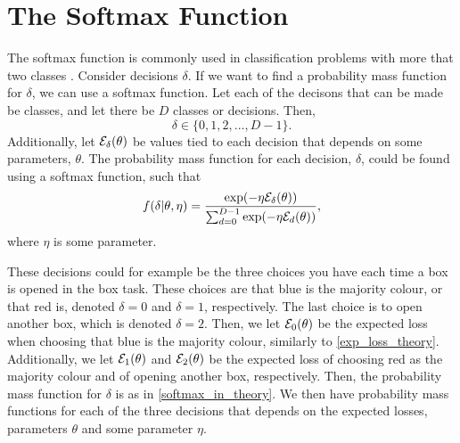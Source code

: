 \section{The Softmax Function} \label{section_theory_softmax}
The softmax function is commonly used in classification problems with more that two classes \citep{softmax}. Consider decisions $\delta$. If we want to find a probability mass function for $\delta$, we can use a softmax function. Let each of the decisons that can be made be classes, and let there be $D$ classes or decisions. Then, 
\begin{equation*}
    \delta \in \{0,1,2,...,D-1\}.
\end{equation*}
Additionally, let $\mathcal{E}_{\delta}(\theta)$ be values tied to each decision that depends on some parameters, $\theta$. The probability mass function for each decision, $\delta$, could be found using a softmax function, such that
\begin{equation}
\label{softmax_in_theory}
    \begin{aligned}
        f(\delta|\theta,\eta) = \frac{\text{exp}(- \eta \mathcal{E}_{\delta}(\theta))}{\sum_{d=0}^{D-1} \text{exp}(-\eta \mathcal{E}_{d}(\theta))},
    \end{aligned}
\end{equation}
where $\eta$ is some parameter. 


These decisions could for example be the three choices you have each time a box is opened in the box task. These choices are that blue is the majority colour, or that red is, denoted $\delta=0$ and $\delta=1$, respectively. The last choice is to open another box, which is denoted $\delta=2$. Then, we let $\mathcal{E}_0(\theta)$ be the expected loss when choosing that blue is the majority colour, similarly to \eqref{exp_loss_theory}. Additionally, we let $\mathcal{E}_1(\theta)$ and $\mathcal{E}_2(\theta)$ be the expected loss of choosing red as the majority colour and of opening another box, respectively. Then, the probability mass function for $\delta$ is as in \eqref{softmax_in_theory}. We then have probability mass functions for each of the three decisions that depends on the expected losses, parameters $\theta$ and some parameter $\eta$.




